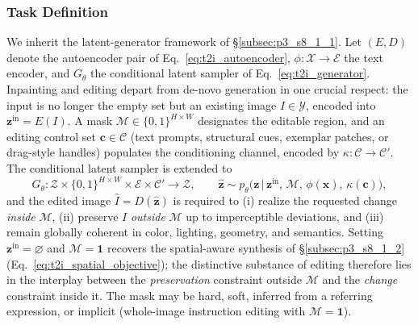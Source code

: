 \subsubsection{Task Definition}
\label{subsubsec:p3_s8_1_3_task}
We inherit the latent-generator framework of §\ref{subsec:p3_s8_1_1}.
Let $(E,D)$ denote the autoencoder pair of Eq.~\eqref{eq:t2i_autoencoder}, $\phi:\mathcal{X}\!\rightarrow\!\mathcal{E}$ the text encoder, and $G_\theta$ the conditional latent sampler of Eq.~\eqref{eq:t2i_generator}.
Inpainting and editing depart from de-novo generation in one crucial respect: the input is no longer the empty set but an existing image $I\in\mathcal{Y}$, encoded into $\mathbf{z}^{\text{in}}=E(I)$.
A mask $\mathcal{M}\in\{0,1\}^{H\times W}$ designates the editable region, and an editing control set $\mathbf{c}\in\mathcal{C}$ (text prompts, structural cues, exemplar patches, or drag-style handles) populates the conditioning channel, encoded by $\kappa:\mathcal{C}\!\rightarrow\!\mathcal{C}'$.
The conditional latent sampler is extended to
\begin{equation}
G_\theta:\mathcal{Z}\times\{0,1\}^{H\times W}\times\mathcal{E}\times\mathcal{C}'\!\rightarrow\!\mathcal{Z},\qquad
\hat{\mathbf{z}}\sim p_\theta\!\big(\mathbf{z}\,\big|\,\mathbf{z}^{\text{in}},\,\mathcal{M},\,\phi(\mathbf{x}),\,\kappa(\mathbf{c})\big),
\label{eq:t2i_edit_objective}
\end{equation}
and the edited image $\hat{I}=D(\hat{\mathbf{z}})$ is required to (i) realize the requested change \emph{inside} $\mathcal{M}$, (ii) preserve $I$ \emph{outside} $\mathcal{M}$ up to imperceptible deviations, and (iii) remain globally coherent in color, lighting, geometry, and semantics.
Setting $\mathbf{z}^{\text{in}}=\varnothing$ and $\mathcal{M}=\mathbf{1}$ recovers the spatial-aware synthesis of §\ref{subsec:p3_s8_1_2} (Eq.~\eqref{eq:t2i_spatial_objective}); the distinctive substance of editing therefore lies in the interplay between the \emph{preservation} constraint outside $\mathcal{M}$ and the \emph{change} constraint inside it.
The mask may be hard, soft, inferred from a referring expression, or implicit (whole-image instruction editing with $\mathcal{M}=\mathbf{1}$).

